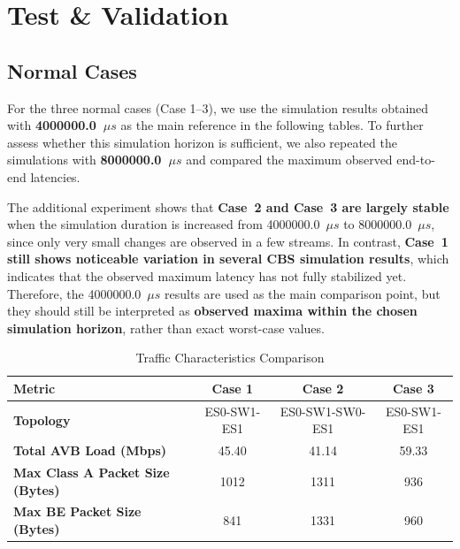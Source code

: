 \section{Test \& Validation}
\subsection{Normal Cases}

For the three normal cases (Case 1--3), we use the simulation results obtained with \textbf{4000000.0~$\mu s$} as the main reference in the following tables. To further assess whether this simulation horizon is sufficient, we also repeated the simulations with \textbf{8000000.0~$\mu s$} and compared the maximum observed end-to-end latencies.

The additional experiment shows that \textbf{Case~2 and Case~3 are largely stable} when the simulation duration is increased from 4000000.0~$\mu s$ to 8000000.0~$\mu s$, since only very small changes are observed in a few streams. In contrast, \textbf{Case~1 still shows noticeable variation in several CBS simulation results}, which indicates that the observed maximum latency has not fully stabilized yet. Therefore, the 4000000.0~$\mu s$ results are used as the main comparison point, but they should still be interpreted as \textbf{observed maxima within the chosen simulation horizon}, rather than exact worst-case values.

\begin{table}[H]
    \centering
    \caption{Traffic Characteristics Comparison}
    \label{tab:traffic_characteristics}
    \begin{tabular}{lccc}
        \toprule
        \textbf{Metric} & \textbf{Case 1} & \textbf{Case 2} & \textbf{Case 3} \\
        \midrule
        \textbf{Topology} & ES0-SW1-ES1 & ES0-SW1-SW0-ES1 & ES0-SW1-ES1 \\
        \textbf{Total AVB Load (Mbps)} & 45.40 & 41.14 & 59.33 \\
        \textbf{Max Class A Packet Size (Bytes)} & 1012 & 1311 & 936 \\
        \textbf{Max BE Packet Size (Bytes)} & 841 & 1331 & 960 \\
        \bottomrule
    \end{tabular}
\end{table}

